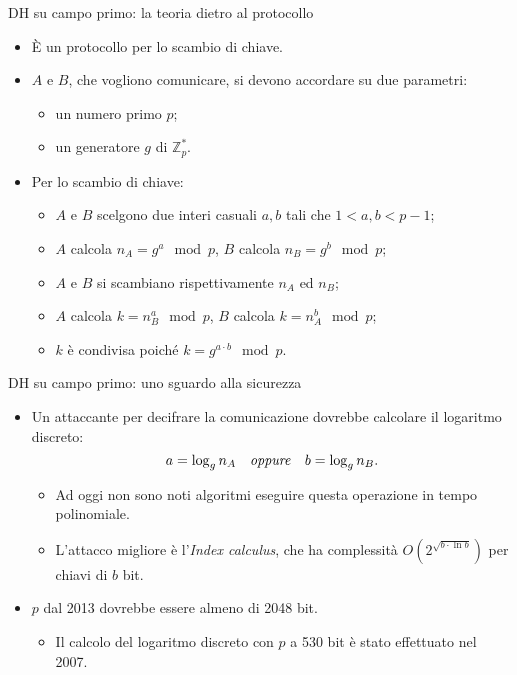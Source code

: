 \documentclass[11pt,svgnames,smaller,aspectratio=169,italian]{beamer}
\begin{document}
\begin{frame}{DH su campo primo: la teoria dietro al protocollo}
	\begin{itemize}
		\item È un protocollo per lo scambio di chiave.
		\item $A$ e $B$, che vogliono comunicare, si devono accordare su due parametri:
			\begin{itemize}
				\item un numero primo $p$;
				\item un generatore $g$ di $\mathds{Z}_{p}^{*}$.
			\end{itemize}
		\item Per lo scambio di chiave:
			\begin{itemize}
				\item $A$ e $B$ scelgono due interi casuali $a, b$ tali che $1 < a, b < p - 1$;
				\item $A$ calcola $n_{A} = g^{a} \mod p$, $B$ calcola $n_{B} = g^{b} \mod p$;
				\item $A$ e $B$ si scambiano rispettivamente $n_{A}$ ed $n_{B}$;
				\item $A$ calcola $k = n_{B}^{a} \mod p$, $B$ calcola $k = n_{A}^{b} \mod p$;
				\item $k$ è condivisa poiché $k = g^{a \cdot b} \mod p$.
			\end{itemize}
	\end{itemize}
\end{frame}

\begin{frame}{DH su campo primo: uno sguardo alla sicurezza}
	\begin{itemize}
		\item Un attaccante per decifrare la comunicazione dovrebbe calcolare il logaritmo discreto:
			\begin{equation*}
				a = \log_{g} n_{A}	\quad\text{\emph{oppure}}	\quad b = \log_{g} n_{B}.
			\end{equation*}
			\begin{itemize}
				\item Ad oggi non sono noti algoritmi eseguire questa operazione in tempo polinomiale.
				\item L'attacco migliore è l'\emph{Index calculus}, che ha complessità $O(2^{\sqrt{b \cdot \ln b}})$ per chiavi di $b$ bit.
			\end{itemize}
		\item $p$ dal 2013 dovrebbe essere almeno di 2048 bit.
			\begin{itemize}
				\item Il calcolo del logaritmo discreto con $p$ a 530 bit è stato effettuato nel 2007.
			\end{itemize}
	\end{itemize}
\end{frame}
\end{document}
